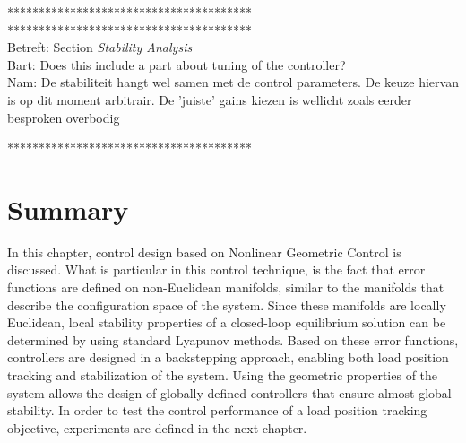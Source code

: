 ***************************************\\


***************************************\\
Betreft: Section \textit{Stability Analysis}\\
Bart: Does this include a part about tuning of the controller?\\
Nam: De stabiliteit hangt wel samen met de control parameters. De keuze hiervan is op dit moment arbitrair. De 'juiste' gains kiezen is wellicht zoals eerder besproken overbodig 

***************************************\\

\section*{Summary}
In this chapter, control design based on Nonlinear Geometric Control is discussed.
What is particular in this control technique, is the fact that error functions are defined on non-Euclidean manifolds, similar to the manifolds that describe the configuration space of the system.
Since these manifolds are locally Euclidean, local stability properties of a closed-loop equilibrium solution can be determined by using standard Lyapunov methods. 
Based on these error functions, controllers are designed in a backstepping approach, enabling both load position tracking and stabilization of the system.
Using the geometric properties of the system allows the design of globally defined controllers that ensure almost-global stability.
In order to test the control performance of a load position tracking objective, experiments are defined in the next chapter. 







